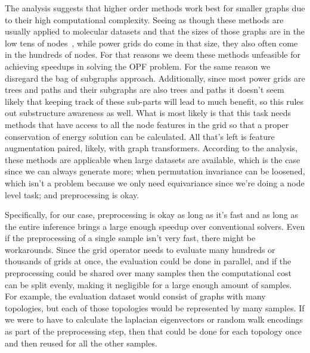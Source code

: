 The analysis suggests that higher order methods work best for smaller graphs due to their
high computational complexity.
Seeing as though these methods are usually applied to molecular datasets and that the
sizes of those graphs are in the low tens of nodes~\cite{morris2020tudataset},
while power grids do come in that size, they also often come in the hundreds of nodes.
For that reasons we deem these methods unfeasible for achieving speedups in solving the OPF problem.
For the same reason we disregard the bag of subgraphs approach.
Additionally, since most power grids are trees and paths and their subgraphs are also trees and paths
it doesn't seem likely that keeping track of these sub-parts will lead to much benefit, so this
rules out substructure awareness as well.
What is most likely is that this task needs methods that have access to all the node features in the
grid so that a proper conservation of energy solution can be calculated.
All that's left is feature augmentation paired, likely, with graph transformers.
According to the analysis, these methods are applicable when large datasets are available,
which is the case since we can always generate more; when permutation invariance can be loosened,
which isn't a problem because we only need equivariance since we're doing a node level task; and
preprocessing is okay.

Specifically, for our case, preprocessing is okay as long as it's fast and as long as the
entire inference brings a large enough speedup over conventional solvers.
Even if the preprocessing of a single sample isn't very fast, there might be workarounds.
Since the grid operator needs to evaluate many hundreds or thousands of grids at once, the
evaluation could be done in parallel, and if the preprocessing could be shared over many
samples then the computational cost can be split evenly, making it negligible for a large
enough amount of samples.
For example, the evaluation dataset would consist of graphs with many topologies, but each
of those topologies would be represented by many samples.
If we were to have to calculate the laplacian eigenvectors or random walk encodings as part
of the preprocessing step, then that could be done for each topology once and then reused
for all the other samples.

